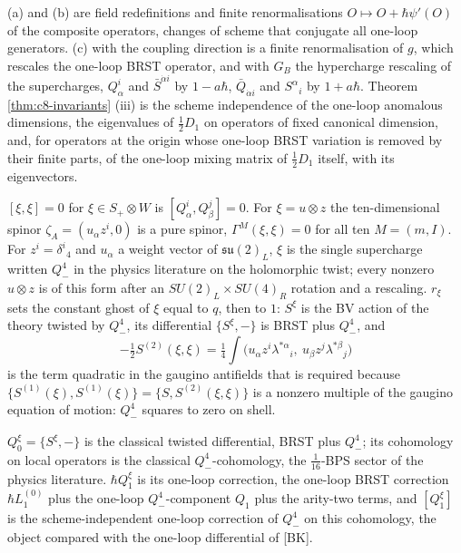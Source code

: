 \begin{remark}
(a) and (b) are field redefinitions and finite renormalisations $O\mapsto O+\hbar\psi'(O)$ of the composite operators, changes of scheme that conjugate all one-loop generators. (c) with the coupling direction is a finite renormalisation of $g$, which rescales the one-loop BRST operator, and with $G_B$ the hypercharge rescaling of the supercharges, $Q^i_\alpha$ and $\bar S^{\dot\alpha i}$ by $1-a\hbar$, $\bar Q_{\dot\alpha i}$ and $S^\alpha{}_i$ by $1+a\hbar$. Theorem \ref{thm:c8-invariants} (iii) is the scheme independence of the one-loop anomalous dimensions, the eigenvalues of $\tfrac12D_1$ on operators of fixed canonical dimension, and, for operators at the origin whose one-loop BRST variation is removed by their finite parts, of the one-loop mixing matrix of $\tfrac12D_1$ itself, with its eigenvectors.
\end{remark}

\begin{remark}
$[\xi,\xi]=0$ for $\xi\in S_+\otimes W$ is $[Q^i_\alpha,Q^j_\beta]=0$. For $\xi=u\otimes z$ the ten-dimensional spinor $\zeta_A=(u_\alpha z^i,0)$ is a pure spinor, $\Gamma^M(\xi,\xi)=0$ for all ten $M=(m,I)$. For $z^i=\delta^i{}_4$ and $u_\alpha$ a weight vector of $\mathfrak{su}(2)_L$, $\xi$ is the single supercharge written $Q^4_-$ in the physics literature on the holomorphic twist; every nonzero $u\otimes z$ is of this form after an $SU(2)_L\times SU(4)_R$ rotation and a rescaling. $r_\xi$ sets the constant ghost of $\xi$ equal to $q$, then to $1$: $S^\xi$ is the BV action of the theory twisted by $Q^4_-$, its differential $\{S^\xi,-\}$ is BRST plus $Q^4_-$, and
\[
-\tfrac12S^{(2)}(\xi,\xi)=\tfrac14\int\big(u_\alpha z^i\lambda^{*\alpha}{}_i,\ u_\beta z^j\lambda^{*\beta}{}_j\big)
\]
is the term quadratic in the gaugino antifields that is required because $\{S^{(1)}(\xi),S^{(1)}(\xi)\}=\{S,S^{(2)}(\xi,\xi)\}$ is a nonzero multiple of the gaugino equation of motion: $Q^4_-$ squares to zero on shell.
\end{remark}

\begin{remark}
$Q^\xi_0=\{S^\xi,-\}$ is the classical twisted differential, BRST plus $Q^4_-$; its cohomology on local operators is the classical $Q^4_-$-cohomology, the $\tfrac1{16}$-BPS sector of the physics literature. $\hbar Q^\xi_1$ is its one-loop correction, the one-loop BRST correction $\hbar L_1^{(0)}$ plus the one-loop $Q^4_-$-component $Q_1$ plus the arity-two terms, and $[Q^\xi_1]$ is the scheme-independent one-loop correction of $Q^4_-$ on this cohomology, the object compared with the one-loop differential of [BK].
\end{remark}

